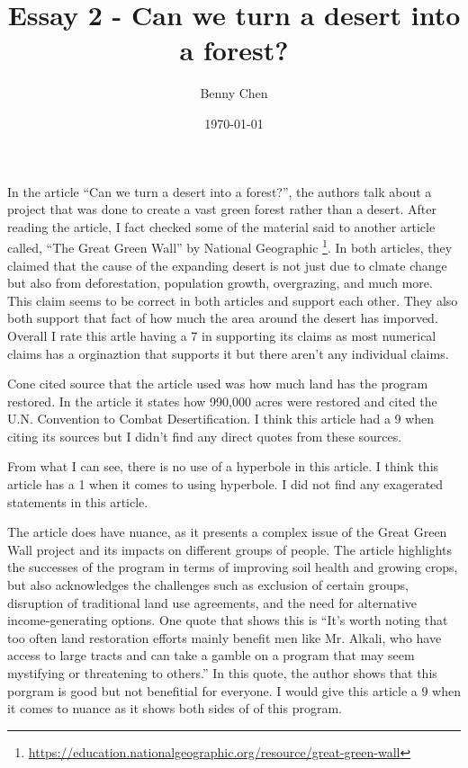 \documentclass{article}
\title{Essay 2 - Can we turn a desert into a forest?}
\author{Benny Chen}
\date{\today}
\begin{document}
\maketitle

In the article ``Can we turn a desert into a forest?'', the authors talk about a project that was done to create a vast green forest rather than a desert. After reading the article, I fact checked some of the material said to another article called, ``The Great Green Wall'' by National Geographic \footnote[1]{\url{https://education.nationalgeographic.org/resource/great-green-wall}}. In both articles, they claimed that the cause of the expanding desert is not just due to clmate change but also from deforestation, population growth, overgrazing, and much more. This claim seems to be correct in both articles and support each other. They also both support that fact of how much the area around the desert has imporved. Overall I rate this artle having a 7 in supporting its claims as most numerical claims has a orginaztion that supports it but there aren't any individual claims.

Cone cited source that the article used was how much land has the program restored. In the article it states how 990,000 acres were restored and cited the U.N. Convention to Combat Desertification. I think this article had a 9 when citing its sources but I didn't find any direct quotes from these sources. 

From what I can see, there is no use of a hyperbole in this article. I think this article has a 1 when it comes to using hyperbole. I did not find any exagerated statements in this article.

The article does have nuance, as it presents a complex issue of the Great Green Wall project and its impacts on different groups of people. The article highlights the successes of the program in terms of improving soil health and growing crops, but also acknowledges the challenges such as exclusion of certain groups, disruption of traditional land use agreements, and the need for alternative income-generating options. One quote that shows this is ``It's worth noting that too often land restoration efforts mainly benefit men like Mr. Alkali, who have access to large tracts and can take a gamble on a program that may seem mystifying or threatening to others.'' In this quote, the author shows that this porgram is good but not benefitial for everyone. I would give this article a 9 when it comes to nuance as it shows both sides of of this program.
\end{document}
